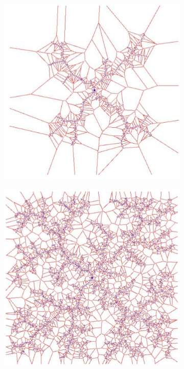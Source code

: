 \begin{figure}[h!]
\begin{subfigure}{.3\textwidth}
	\end{subfigure}
	\begin{subfigure}{.3\textwidth}
		\includegraphics[width=\textwidth]{figures/ch04_voron3.png}
	\end{subfigure}
	\begin{subfigure}{.3\textwidth}
		\includegraphics[width=\textwidth]{figures/ch04_voron5.png}

\end{subfigure}
\end{figure}
